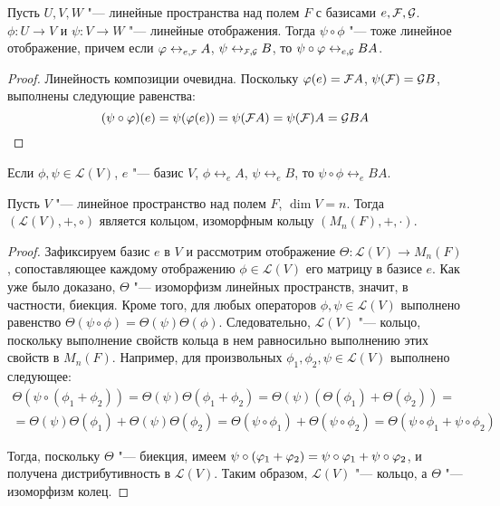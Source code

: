 \begin{proposition}
	Пусть $U, V, W$ "--- линейные пространства над полем $F$ с базисами $e, \FF , \GG $. $\phi: U \rightarrow V$ и $\psi: V \rightarrow W$ "--- линейные отображения. Тогда $\psi \circ \phi$ "--- тоже линейное отображение, причем если $\phi \leftrightarrow_{e, \FFF} A$, $\psi \leftrightarrow_{\FFF , \GGG} B$, то $\psi \circ \phi \leftrightarrow_{e, \GGG} BA$.
\end{proposition}

\begin{proof}
	Линейность композиции очевидна. Поскольку $\phi(e) = \FF A$, $\psi(\FF ) = \GG B$, выполнены следующие равенства:
	\[(\psi \circ \phi)(e) = \psi(\phi(e)) = \psi(\FF A) = \psi(\FF )A = \GG BA\qedhere\]
\end{proof}

\begin{corollary}
	Если $\phi, \psi \in \mathcal{L}(V)$, $e$ "--- базис $V$, $\phi \leftrightarrow_{e} A$, $\psi \leftrightarrow_{e} B$, то $\psi \circ \phi \leftrightarrow_{e} BA$.
\end{corollary}

\begin{corollary}
	Пусть $V$ "--- линейное пространство над полем $F$, $\dim{V} = n$. Тогда $(\mathcal{L}(V), +, \circ)$ является кольцом, изоморфным кольцу $(M_n(F), +, \cdot)$.
\end{corollary}

\begin{proof}
	Зафиксируем базис $e$ в $V$ и рассмотрим отображение ${\Theta: \mathcal{L}(V) \to M_n(F)}$, сопоставляющее каждому отображению $\phi \in \mathcal{L}(V)$ его матрицу в базисе $e$. Как уже было доказано, $\Theta$ "--- изоморфизм линейных пространств, значит, в частности, биекция. Кроме того, для любых операторов $\phi, \psi \in \mathcal L(V)$ выполнено равенство $\Theta(\psi \circ \phi) = \Theta(\psi)\Theta(\phi)$. Следовательно, $\mathcal{L}(V)$ "--- кольцо, поскольку выполнение свойств кольца в нем равносильно выполнению этих свойств в $M_n(F)$. Например, для произвольных $ \phi_1, \phi_2, \psi \in \mathcal L(V)$ выполнено следующее:
	\begin{multline*}
	\Theta(\psi \circ (\phi_1 + \phi_2)) = \Theta(\psi)\Theta(\phi_1 + \phi_2) = \Theta(\psi)(\Theta(\phi_1) + \Theta(\phi_2)) =\\ = \Theta(\psi)\Theta(\phi_1) + \Theta(\psi)\Theta(\phi_2) = \Theta(\psi \circ \phi_1) + \Theta(\psi \circ \phi_2) = \Theta(\psi \circ \phi_1 + \psi \circ \phi_2)
	\end{multline*}
	
	Тогда, поскольку $\Theta$ "--- биекция, имеем $\psi \circ (\phi_1 + \phi_2) \hm{=} \psi \circ \phi_1 + \psi \circ \phi_2$, и получена дистрибутивность в $\mathcal L (V)$. Таким образом, $\mathcal{L}(V)$ "--- кольцо, а $\Theta$ "--- изоморфизм колец.
\end{proof}

